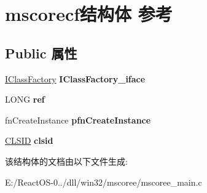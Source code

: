 \hypertarget{structmscorecf}{}\section{mscorecf结构体 参考}
\label{structmscorecf}
\subsection*{Public 属性}
\begin{DoxyCompactItemize}
\item 
\mbox{\label{structmscorecf_a6ec39d6770b230161957bba248df042d}} 
\hyperlink{interface_i_class_factory}{I\+Class\+Factory} {\bfseries I\+Class\+Factory\+\_\+iface}
\item 
\mbox{\label{structmscorecf_ab3057aef9c58db0b65ed9fc9e14a6391}} 
L\+O\+NG {\bfseries ref}
\item 
\mbox{\label{structmscorecf_a905571d47cbac29c9db94099f8036b12}} 
fn\+Create\+Instance {\bfseries pfn\+Create\+Instance}
\item 
\mbox{\label{structmscorecf_a86c0cdde897f9a19738850c4bc632d4c}} 
\hyperlink{struct___i_i_d}{C\+L\+S\+ID} {\bfseries clsid}
\end{DoxyCompactItemize}


该结构体的文档由以下文件生成\+:\begin{DoxyCompactItemize}
\item 
E\+:/\+React\+O\+S-\/0../dll/win32/mscoree/mscoree\+\_\+main.\+c\end{DoxyCompactItemize}

